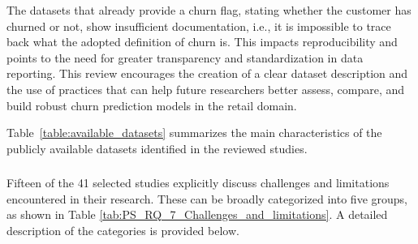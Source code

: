The datasets that already provide a churn flag, stating whether the customer has churned or not, show insufficient documentation, i.e., it is impossible to trace back what the adopted definition of churn is. This impacts reproducibility and points to the need for greater transparency and standardization in data reporting. 
This review encourages the creation of a clear dataset description and the use of practices that can help future researchers better assess, compare, and build robust churn prediction models in the retail domain.

Table~\ref{table:available_datasets} summarizes the main characteristics of the publicly available datasets identified in the reviewed studies.



\subsubsection{\RSRQseven}
\label{sec:RQ7}

Fifteen of the 41 selected studies explicitly discuss challenges and limitations encountered in their research. These can be broadly categorized into five groups, as shown in Table \ref{tab:PS_RQ_7_Challenges_and_limitations}. A detailed description of the categories is provided below.


